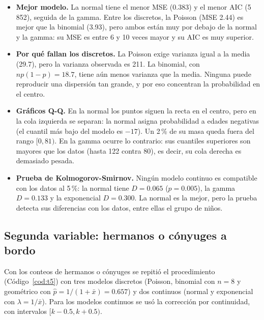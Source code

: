 \documentclass[11pt,letterpaper]{article}
\begin{document}
\begin{itemize}
    \item \textbf{Mejor modelo.} La normal tiene el menor MSE (0.383) y el menor AIC (5\,852), seguida de la gamma. Entre los discretos, la Poisson (MSE 2.44) es mejor que la binomial (3.93), pero ambos están muy por debajo de la normal y la gamma: su MSE es entre 6 y 10 veces mayor y su AIC es muy superior.
    \item \textbf{Por qué fallan los discretos.} La Poisson exige varianza igual a la media (29.7), pero la varianza observada es 211. La binomial, con $np(1-p) = 18.7$, tiene aún menos varianza que la media. Ninguna puede reproducir una dispersión tan grande, y por eso concentran la probabilidad en el centro.
    \item \textbf{Gráficos Q-Q.} En la normal los puntos siguen la recta en el centro, pero en la cola izquierda se separan: la normal asigna probabilidad a edades negativas (el cuantil más bajo del modelo es $-17$). Un 2\,\% de su masa queda fuera del rango $[0, 81)$. En la gamma ocurre lo contrario: sus cuantiles superiores son mayores que los datos (hasta 122 contra 80), es decir, su cola derecha es demasiado pesada.
    \item \textbf{Prueba de Kolmogorov-Smirnov.} Ningún modelo continuo es compatible con los datos al 5\,\%: la normal tiene $D = 0.065$ ($p = 0.005$), la gamma $D = 0.133$ y la exponencial $D = 0.300$. La normal es la mejor, pero la prueba detecta sus diferencias con los datos, entre ellas el grupo de niños.
\end{itemize}

\subsection{Segunda variable: hermanos o cónyuges a bordo}

Con los conteos de hermanos o cónyuges se repitió el procedimiento (Código~\ref{cod:t5}) con tres modelos discretos (Poisson, binomial con $n = 8$ y geométrico con $\hat p = 1/(1+\bar x) = 0.657$) y dos continuos (normal y exponencial con $\lambda = 1/\bar{x}$). Para los modelos continuos se usó la corrección por continuidad, con intervalos $[k - 0.5, k + 0.5)$.
\end{document}
